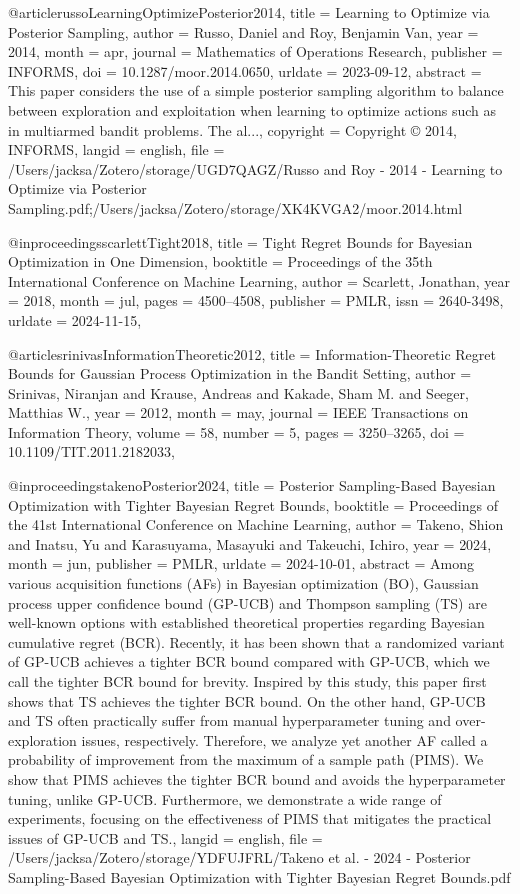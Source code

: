 @article{russoLearningOptimizePosterior2014,
  title = {Learning to {{Optimize}} via {{Posterior Sampling}}},
  author = {Russo, Daniel and Roy, Benjamin Van},
  year = {2014},
  month = apr,
  journal = {Mathematics of Operations Research},
  publisher = {INFORMS},
  doi = {10.1287/moor.2014.0650},
  urldate = {2023-09-12},
  abstract = {This paper considers the use of a simple posterior sampling algorithm to balance between exploration and exploitation when learning to optimize actions such as in multiarmed bandit problems. The al...},
  copyright = {Copyright {\copyright} 2014, INFORMS},
  langid = {english},
  file = {/Users/jacksa/Zotero/storage/UGD7QAGZ/Russo and Roy - 2014 - Learning to Optimize via Posterior Sampling.pdf;/Users/jacksa/Zotero/storage/XK4KVGA2/moor.2014.html}
}

@inproceedings{scarlettTight2018,
  title = {Tight {{Regret Bounds}} for {{Bayesian Optimization}} in {{One Dimension}}},
  booktitle = {Proceedings of the 35th {{International Conference}} on {{Machine Learning}}},
  author = {Scarlett, Jonathan},
  year = {2018},
  month = jul,
  pages = {4500--4508},
  publisher = {PMLR},
  issn = {2640-3498},
  urldate = {2024-11-15},
}

@article{srinivasInformationTheoretic2012,
  title = {Information-{{Theoretic Regret Bounds}} for {{Gaussian Process Optimization}} in the {{Bandit Setting}}},
  author = {Srinivas, Niranjan and Krause, Andreas and Kakade, Sham M. and Seeger, Matthias W.},
  year = {2012},
  month = may,
  journal = {IEEE Transactions on Information Theory},
  volume = {58},
  number = {5},
  pages = {3250--3265},
  doi = {10.1109/TIT.2011.2182033},
}

@inproceedings{takenoPosterior2024,
  title = {Posterior {{Sampling-Based Bayesian Optimization}} with {{Tighter Bayesian Regret Bounds}}},
  booktitle = {Proceedings of the 41st {{International Conference}} on {{Machine Learning}}},
  author = {Takeno, Shion and Inatsu, Yu and Karasuyama, Masayuki and Takeuchi, Ichiro},
  year = {2024},
  month = jun,
  publisher = {PMLR},
  urldate = {2024-10-01},
  abstract = {Among various acquisition functions (AFs) in Bayesian optimization (BO), Gaussian process upper confidence bound (GP-UCB) and Thompson sampling (TS) are well-known options with established theoretical properties regarding Bayesian cumulative regret (BCR). Recently, it has been shown that a randomized variant of GP-UCB achieves a tighter BCR bound compared with GP-UCB, which we call the tighter BCR bound for brevity. Inspired by this study, this paper first shows that TS achieves the tighter BCR bound. On the other hand, GP-UCB and TS often practically suffer from manual hyperparameter tuning and over-exploration issues, respectively. Therefore, we analyze yet another AF called a probability of improvement from the maximum of a sample path (PIMS). We show that PIMS achieves the tighter BCR bound and avoids the hyperparameter tuning, unlike GP-UCB. Furthermore, we demonstrate a wide range of experiments, focusing on the effectiveness of PIMS that mitigates the practical issues of GP-UCB and TS.},
  langid = {english},
  file = {/Users/jacksa/Zotero/storage/YDFUJFRL/Takeno et al. - 2024 - Posterior Sampling-Based Bayesian Optimization with Tighter Bayesian Regret Bounds.pdf}
}

